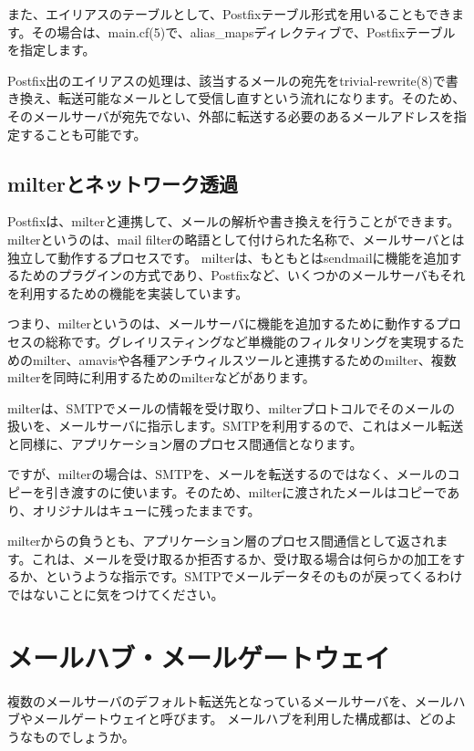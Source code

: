 また、エイリアスのテーブルとして、Postfixテーブル形式を用いることもできます。その場合は、main.cf(5)で、alias\_mapsディレクティブで、Postfixテーブルを指定します。

Postfix出のエイリアスの処理は、該当するメールの宛先をtrivial-rewrite(8)で書き換え、転送可能なメールとして受信し直すという流れになります。そのため、そのメールサーバが宛先でない、外部に転送する必要のあるメールアドレスを指定することも可能です。

\subsection{milterとネットワーク透過}

Postfixは、milterと連携して、メールの解析や書き換えを行うことができます。milterというのは、mail filterの略語として付けられた名称で、メールサーバとは独立して動作するプロセスです。
milterは、もともとはsendmailに機能を追加するためのプラグインの方式であり、Postfixなど、いくつかのメールサーバもそれを利用するための機能を実装しています。

つまり、milterというのは、メールサーバに機能を追加するために動作するプロセスの総称です。グレイリスティングなど単機能のフィルタリングを実現するためのmilter、amavisや各種アンチウィルスツールと連携するためのmilter、複数milterを同時に利用するためのmilterなどがあります。

milterは、SMTPでメールの情報を受け取り、milterプロトコルでそのメールの扱いを、メールサーバに指示します。SMTPを利用するので、これはメール転送と同様に、アプリケーション層のプロセス間通信となります。

ですが、milterの場合は、SMTPを、メールを転送するのではなく、メールのコピーを引き渡すのに使います。そのため、milterに渡されたメールはコピーであり、オリジナルはキューに残ったままです。

milterからの負うとも、アプリケーション層のプロセス間通信として返されます。これは、メールを受け取るか拒否するか、受け取る場合は何らかの加工をするか、というような指示です。SMTPでメールデータそのものが戻ってくるわけではないことに気をつけてください。

\section{メールハブ・メールゲートウェイ}

複数のメールサーバのデフォルト転送先となっているメールサーバを、メールハブやメールゲートウェイと呼びます。
メールハブを利用した構成都は、どのようなものでしょうか。

